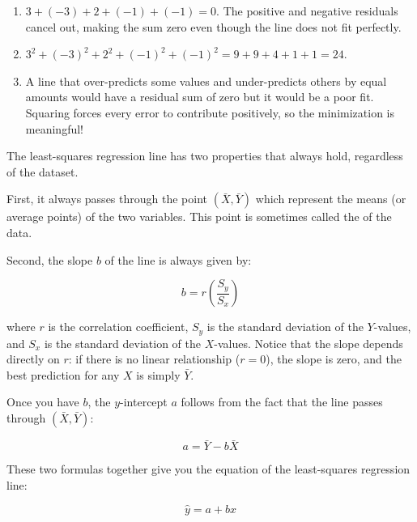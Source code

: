 \begin{Answer}[ref={ex:lr_whysquare}]
\begin{enumerate}
    \item $3 + (-3) + 2 + (-1) + (-1) = 0$. The positive and negative residuals
    cancel out, making the sum zero even though the line does not fit perfectly.
    \item $3^2 + (-3)^2 + 2^2 + (-1)^2 + (-1)^2 = 9 + 9 + 4 + 1 + 1 = 24$.
    \item A line that over-predicts some values and under-predicts
    others by equal amounts would have a residual sum of zero but it would be
    a poor fit. Squaring forces every error to contribute positively, so the
    minimization is meaningful!
\end{enumerate}
\end{Answer}

The least-squares regression line has two properties that always hold, regardless
of the dataset.

First, it always passes through the point $(\bar{X}, \bar{Y})$ which represent the means (or average points) of
the two variables. This point is sometimes called the 
of the data.

Second, the slope $b$ of the line is always given by:

\[
b = r \left(\frac{S_y}{S_x}\right)
\]

where $r$ is the correlation coefficient, $S_y$ is the standard deviation of the
$Y$-values, and $S_x$ is the standard deviation of the $X$-values. Notice that the
slope depends directly on $r$: if there is no linear relationship ($r = 0$), the
slope is zero, and the best prediction for any $X$ is simply $\bar{Y}$.

Once you have $b$, the $y$-intercept $a$ follows from the fact that the line passes
through $(\bar{X}, \bar{Y})$:

\[
a = \bar{Y} - b\bar{X}
\]

These two formulas together give you the equation of the least-squares regression
line:

\[
\hat{y} = a + bx
\]

